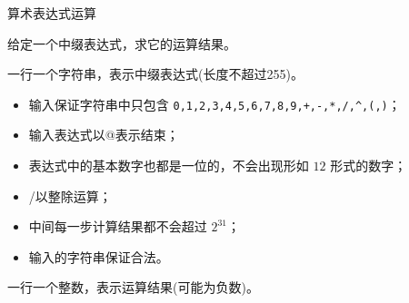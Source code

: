 算术表达式运算

给定一个中缀表达式，求它的运算结果。

一行一个字符串，表示中缀表达式(长度不超过255)。

\begin{itemize}
    \item 输入保证字符串中只包含 \texttt{0,1,2,3,4,5,6,7,8,9,+,-,*,/,\^{},(,)}；
    \item 输入表达式以@表示结束；
    \item 表达式中的基本数字也都是一位的，不会出现形如 $12$ 形式的数字；
    \item /以整除运算；
    \item 中间每一步计算结果都不会超过 $2^{31}$；
    \item 输入的字符串保证合法。
\end{itemize}

一行一个整数，表示运算结果(可能为负数)。

